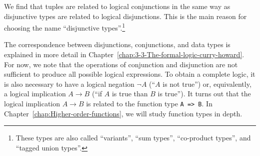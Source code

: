 We find that tuples are related to logical conjunctions in the same
way as disjunctive types are related to logical disjunctions. This
is the main reason for choosing the name \textsf{``}disjunctive types\textsf{''}.\footnote{These types are also called \textsf{``}variants\textsf{''}, \textsf{``}sum types\textsf{''}, \textsf{``}co-product
types\textsf{''}, and \textsf{``}tagged union types\textsf{''}.}

The correspondence between disjunctions, conjunctions, and data types
is explained in more detail in Chapter~\ref{chap:3-3-The-formal-logic-curry-howard}.
For now, we note that the operations of conjunction and disjunction
are not sufficient to produce all possible logical expressions. To
obtain a complete logic, it is also necessary to have a logical negation
$\neg A$ (\textsf{``}$A$ is not true\textsf{''}) or, equivalently, a logical implication
$A\rightarrow B$ (\textsf{``}if $A$ is true than $B$ is true\textsf{''}). It turns
out that the logical implication $A\rightarrow B$ is related to the
function type \lstinline!A => B!. In Chapter~\ref{chap:Higher-order-functions},
we will study function types in depth.
